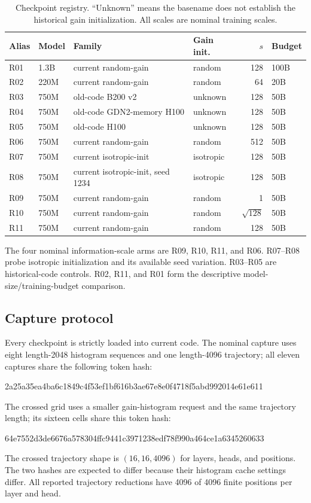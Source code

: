 \documentclass[11pt]{article}
\begin{document}
\begin{table}[htbp]
\centering
\caption{Checkpoint registry.  ``Unknown'' means the basename does not establish the
historical gain initialization.  All scales are nominal training scales.}
\label{tab:inventory}
\small
\begin{tabular}{@{}llllrl@{}}
\toprule
Alias & Model & Family & Gain init. & $s$ & Budget \\
\midrule
R01 & 1.3B & current random-gain & random & 128 & 100B \\
R02 & 220M & current random-gain & random & 64 & 20B \\
R03 & 750M & old-code B200 v2 & unknown & 128 & 50B \\
R04 & 750M & old-code GDN2-memory H100 & unknown & 128 & 50B \\
R05 & 750M & old-code H100 & unknown & 128 & 50B \\
R06 & 750M & current random-gain & random & 512 & 50B \\
R07 & 750M & current isotropic-init & isotropic & 128 & 50B \\
R08 & 750M & current isotropic-init, seed 1234 & isotropic & 128 & 50B \\
R09 & 750M & current random-gain & random & 1 & 50B \\
R10 & 750M & current random-gain & random & $\sqrt{128}$ & 50B \\
R11 & 750M & current random-gain & random & 128 & 50B \\
\bottomrule
\end{tabular}
\end{table}

The four nominal information-scale arms are R09, R10, R11, and R06.  R07--R08 probe
isotropic initialization and its available seed variation.  R03--R05 are historical-code
controls.  R02, R11, and R01 form the descriptive model-size/training-budget comparison.

\subsection{Capture protocol}

Every checkpoint is strictly loaded into current code.  The nominal capture uses eight
length-2048 histogram sequences and one length-4096 trajectory; all eleven captures share
the following token hash:
\begin{center}
\small\ttfamily 2a25a35ea4ba6c1849c4f53ef1bf616b3ae67e8e0f4718f5abd992014e61e611
\end{center}
The crossed grid uses a smaller gain-histogram request and the same trajectory length; its
sixteen cells share this token hash:
\begin{center}
\small\ttfamily 64e7552d3de6676a578304ffc9441c3971238edf78f990a464ce1a6345260633
\end{center}
The crossed trajectory shape is $(16,16,4096)$ for layers, heads, and positions.  The two hashes are
expected to differ because their histogram cache settings differ.  All reported trajectory
reductions have 4096 of 4096 finite positions per layer and head.
\end{document}

